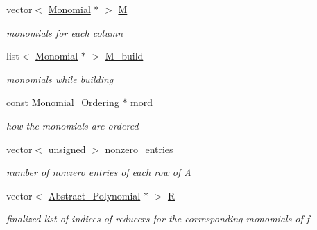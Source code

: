 \begin{DoxyCompactItemize}
vector$<$ \hyperlink{group__polygroup_class_monomial}{Monomial} $\ast$ $>$ \hyperlink{group___g_b_computation_a7dac72addf3ef8ff2c87c247a90eaa9d}{M}
\begin{DoxyCompactList}\small\item\em monomials for each column \end{DoxyCompactList}\item 
\mbox{\label{group___g_b_computation_aee58b978a10b26bbdf1d518e6eb25fb5}} 
list$<$ \hyperlink{group__polygroup_class_monomial}{Monomial} $\ast$ $>$ \hyperlink{group___g_b_computation_aee58b978a10b26bbdf1d518e6eb25fb5}{M\+\_\+build}
\begin{DoxyCompactList}\small\item\em monomials while building \end{DoxyCompactList}\item 
\mbox{\label{group___g_b_computation_a9b23364eb687aaa5c09882f59be4033c}} 
const \hyperlink{group__orderinggroup_class_monomial___ordering}{Monomial\+\_\+\+Ordering} $\ast$ \hyperlink{group___g_b_computation_a9b23364eb687aaa5c09882f59be4033c}{mord}
\begin{DoxyCompactList}\small\item\em how the monomials are ordered \end{DoxyCompactList}\item 
\mbox{\label{group___g_b_computation_a55db3cd23309e08acfbce3b6d2feec85}} 
vector$<$ unsigned $>$ \hyperlink{group___g_b_computation_a55db3cd23309e08acfbce3b6d2feec85}{nonzero\+\_\+entries}
\begin{DoxyCompactList}\small\item\em number of nonzero entries of each row of A \end{DoxyCompactList}\item 
\mbox{\label{group___g_b_computation_a90488d65365fd6a5512ccda45780acc5}} 
vector$<$ \hyperlink{group__polygroup_class_abstract___polynomial}{Abstract\+\_\+\+Polynomial} $\ast$ $>$ \hyperlink{group___g_b_computation_a90488d65365fd6a5512ccda45780acc5}{R}
\begin{DoxyCompactList}\small\item\em finalized list of indices of reducers for the corresponding monomials of {\ttfamily f} \end{DoxyCompactList}\item 

\end{DoxyCompactItemize}
